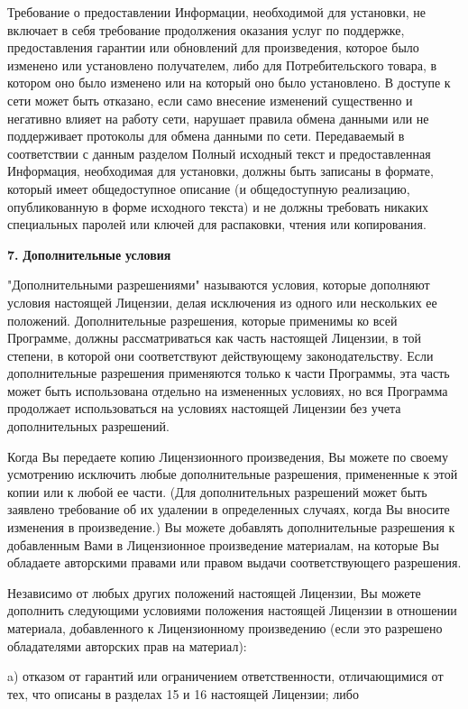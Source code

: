 Требование о предоставлении Информации, необходимой для установки, не включает в себя требование продолжения оказания услуг по поддержке, предоставления гарантии или обновлений для произведения, которое было изменено или установлено получателем, либо для Потребительского товара, в котором оно было изменено или на который оно было установлено. В доступе к сети может быть отказано, если само внесение изменений существенно и негативно влияет на работу сети, нарушает правила обмена данными или не поддерживает протоколы для обмена данными по сети. Передаваемый в соответствии с данным разделом Полный исходный текст и предоставленная Информация, необходимая для установки, должны быть записаны в формате, который имеет общедоступное описание (и общедоступную реализацию, опубликованную в форме исходного текста) и не должны требовать никаких специальных паролей или ключей для распаковки, чтения или копирования.

{\bfseries{7.}} {\bfseries{Дополнительные}} {\bfseries{условия}}

"{}Дополнительными разрешениями"{} называются условия, которые дополняют условия настоящей Лицензии, делая исключения из одного или нескольких ее положений. Дополнительные разрешения, которые применимы ко всей Программе, должны рассматриваться как часть настоящей Лицензии, в той степени, в которой они соответствуют действующему законодательству. Если дополнительные разрешения применяются только к части Программы, эта часть может быть использована отдельно на измененных условиях, но вся Программа продолжает использоваться на условиях настоящей Лицензии без учета дополнительных разрешений.

Когда Вы передаете копию Лицензионного произведения, Вы можете по своему усмотрению исключить любые дополнительные разрешения, примененные к этой копии или к любой ее части. (Для дополнительных разрешений может быть заявлено требование об их удалении в определенных случаях, когда Вы вносите изменения в произведение.) Вы можете добавлять дополнительные разрешения к добавленным Вами в Лицензионное произведение материалам, на которые Вы обладаете авторскими правами или правом выдачи соответствующего разрешения.

Независимо от любых других положений настоящей Лицензии, Вы можете дополнить следующими условиями положения настоящей Лицензии в отношении материала, добавленного к Лицензионному произведению (если это разрешено обладателями авторских прав на материал)\+:

a) отказом от гарантий или ограничением ответственности, отличающимися от тех, что описаны в разделах 15 и 16 настоящей Лицензии; либо

